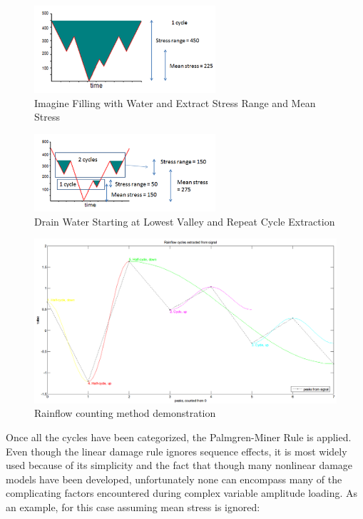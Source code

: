 \documentclass[3p,times,procedia,number]{elsarticle}
\begin{document}
\begin{figure}[h!]
	\centering
	\includegraphics[width=0.6\textwidth]{figures//StressRange.png} 
	\caption{Imagine Filling with Water and Extract Stress Range and Mean Stress}
	\label{StressRange}
\end{figure}

\begin{figure}[h!]
	\centering
	\includegraphics[width=0.6\textwidth]{figures//DrainWater.png} 
	\caption{Drain Water Starting at Lowest Valley and Repeat Cycle Extraction}
	\label{DrainWater}
\end{figure}   

\begin{figure}[h!]
	\centering
	\includegraphics[width=\textwidth]{figures//rfdemo.png} 
	\caption{Rainflow counting method demonstration}
	\label{rfdemo}
\end{figure}  

Once all the cycles have been categorized, the Palmgren-Miner Rule is applied. Even though the linear damage rule ignores sequence effects, it is most widely used because of its simplicity and the fact that though many nonlinear damage models have been developed, unfortunately none can encompass many of the complicating factors encountered during complex variable amplitude loading. As an example, for this case assuming mean stress is ignored:
\end{document}
